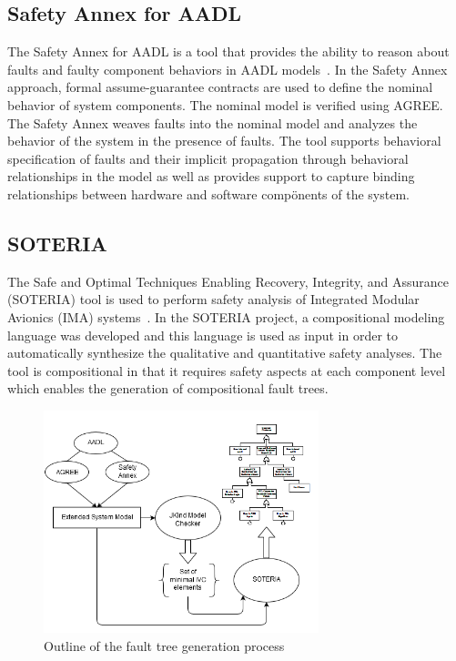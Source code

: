 \subsection{Safety Annex for AADL}
The Safety Annex for AADL is a tool that provides the ability to reason about faults and faulty component behaviors in AADL models~\cite{Stewart17:IMBSA,SATechReport}. In the Safety Annex approach, formal assume-guarantee contracts are used to define the nominal behavior of system components. The nominal model is verified using AGREE. The Safety Annex weaves faults into the nominal model and analyzes the behavior of the system in the presence of faults. The tool supports behavioral specification of faults and their implicit propagation through behavioral relationships in the model as well as provides support to capture binding relationships between hardware and software compönents of the system. 

\subsection{SOTERIA}
The Safe and Optimal Techniques Enabling Recovery, Integrity, and Assurance (SOTERIA) tool is used to perform safety analysis of Integrated Modular Avionics (IMA) systems~\cite{SOTERIAproject}. In the SOTERIA project, a compositional modeling language was developed and this language is used as input in order to automatically synthesize the qualitative and quantitative safety analyses. The tool is compositional in that it requires safety aspects at each component level which enables the generation of compositional fault trees. 

\begin{figure}[h]
\begin{center}
\includegraphics[width=8cm]{images/processFTA.png}
\caption{Outline of the fault tree generation process} \label{fig:processFTA}
\end{center}
\end{figure}

